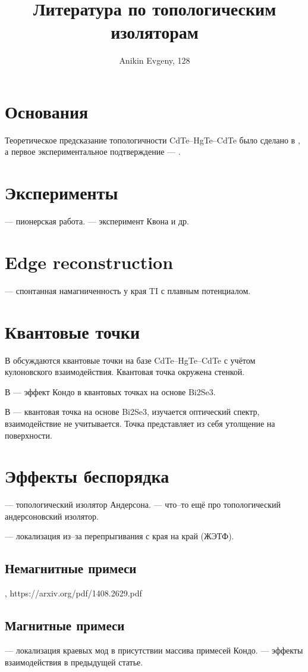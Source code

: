 \documentclass{article}
\title{Литература по топологическим изоляторам}
\author{Anikin Evgeny, 128}
\begin{document}
    \maketitle
    \section{Основания}
    Теоретическое предсказание топологичности CdTe--HgTe--CdTe было сделано в 
    \cite{Bernevig2006}, а первое экспериментальное подтверждение --- \cite{Konig2007}.

    \section{Эксперименты}
    \cite{Konig2007} --- пионерская работа.
    \cite{Gusev2011} --- эксперимент Квона и др.
    \section{Edge reconstruction}
    \cite{Wang2017} --- спонтанная намагниченность у края TI с плавным потенциалом.
    
    \section{Квантовые точки}
    В \cite{Li2014} обсуждаются квантовые точки на базе CdTe--HgTe--CdTe с 
    учётом кулоновского взаимодействия. Квантовая точка окружена стенкой.

    В \cite{Xin2015} --- эффект Кондо в квантовых точках на основе Bi2Se3.

    В \cite{Herath2014} --- квантовая точка на основе Bi2Se3, изучается оптический 
    спектр, взаимодействие не учитывается. Точка представляет из себя утолщение 
    на поверхности.

    \section{Эффекты беспорядка}
    \cite{Li2009} --- топологический изолятор Андерсона.
    \cite{Girschik2015} --- что--то ещё про топологический андерсоновский изолятор. 

    \cite{Entin2015} --- локализация из--за перепрыгивания с края на край (ЖЭТФ).
    \subsection{Немагнитные примеси}
    \cite{Lu2011}, https://arxiv.org/pdf/1408.2629.pdf
    \subsection{Магнитные примеси}
    \cite{Altshuler2013} --- локализация краевых мод в присутствии массива примесей Кондо. 
    \cite{Yevtushenko2015} --- эффекты взаимодействия в предыдущей статье.
    
    \newpage
    
\end{document}
